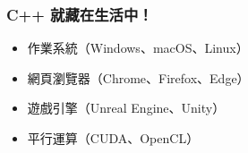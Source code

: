 \documentclass[xcolor=dvipsnames]{beamer}
\begin{document}
    \begin{frame}
        \frametitle{C++ 就藏在生活中！}
        \begin{itemize}
            \item 作業系統（Windows、macOS、Linux）
            \item 網頁瀏覽器（Chrome、Firefox、Edge）
            \item 遊戲引擎（Unreal Engine、Unity）
            \item 平行運算（CUDA、OpenCL）
        \end{itemize}
    \end{frame}
\end{document}

